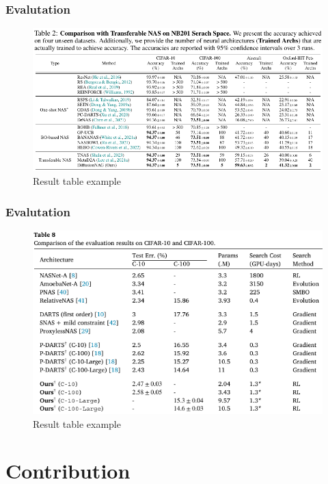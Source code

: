 \documentclass[aspectratio=169,xcolor=dvipsnames]{beamer}
\begin{document}
\begin{frame}
    \frametitle{Evalutation}
    \begin{figure}[htbp]
        \centering
        \includegraphics[height=.7\textheight]{table_diffusionNAG.pdf}
        \caption{Result table example}
    \end{figure}
\end{frame}
\begin{frame}
    \frametitle{Evalutation}
    \begin{figure}[htbp]
        \centering
        \includegraphics[height=.7\textheight]{table_random.pdf}
        \caption{Result table example}
    \end{figure}
\end{frame}

\section{Contribution}
\end{document}
